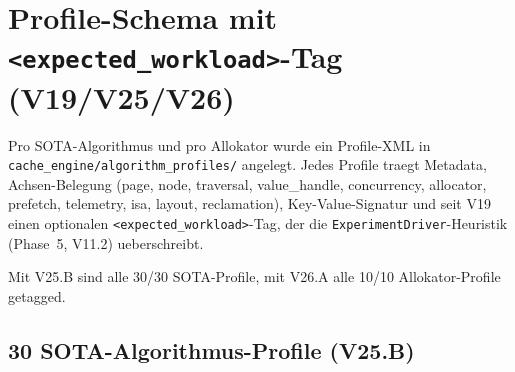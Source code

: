 \section{Profile-Schema mit \texttt{<expected\_workload>}-Tag (V19/V25/V26)}

Pro SOTA-Algorithmus und pro Allokator wurde ein Profile-XML in
\texttt{cache\_engine/algorithm\_profiles/} angelegt. Jedes Profile traegt
Metadata, Achsen-Belegung (page, node, traversal, value\_handle, concurrency,
allocator, prefetch, telemetry, isa, layout, reclamation), Key-Value-Signatur
und seit V19 einen optionalen \texttt{<expected\_workload>}-Tag, der die
\texttt{ExperimentDriver}-Heuristik (Phase~5, V11.2) ueberschreibt.

Mit V25.B sind alle 30/30 SOTA-Profile, mit V26.A alle 10/10
Allokator-Profile getagged.

\subsection{30 SOTA-Algorithmus-Profile (V25.B)}


